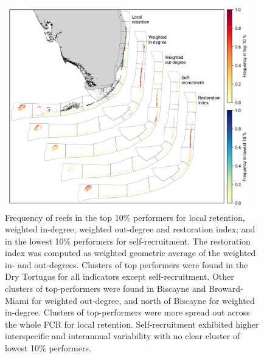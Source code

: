 \documentclass[preprint,12pt,authoryear]{elsarticle}
\begin{document}
	\begin{figure}
		\centering
		\includegraphics[width=0.95\textwidth]{figures/fig_top10.png}
		\caption{Frequency of reefs in the top 10\% performers for local retention, weighted in-degree, weighted out-degree and restoration index; and in the lowest 10\% performers for self-recruitment. The restoration index was computed as weighted geometric average of the weighted in- and out-degrees. Clusters of top performers were found in the Dry Tortugas for all indicators except self-recruitment. Other clusters of top-performers were found in Biscayne and Broward-Miami for weighted out-degree, and north of Biscayne for weighted in-degree. Clusters of top-performers were more spread out across the whole FCR for local retention. Self-recruitment exhibited higher interspecific and interannual variability with no clear cluster of lowest 10\% performers.}\label{fig:top10}
	\end{figure}
	
\end{document}

